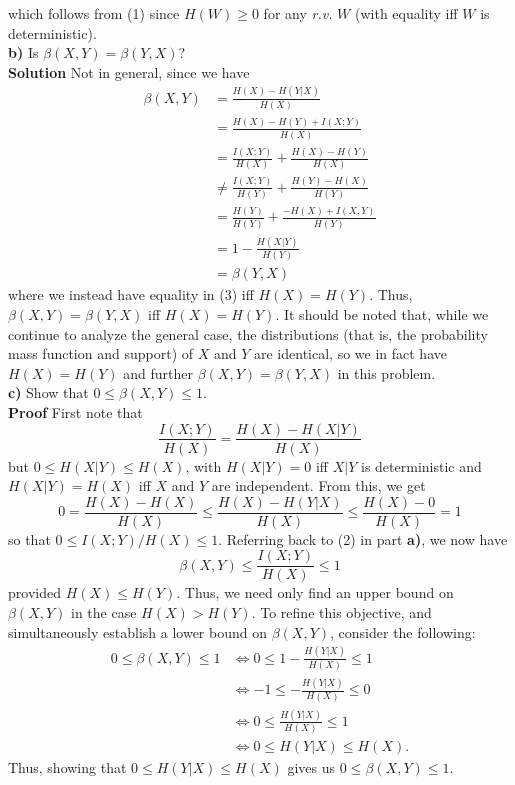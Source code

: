 \documentclass[11pt, letterpaper]{article}
\begin{document}
which follows from (1) since $H(W)\geq 0$ for any {\it r.v.} $W$ (with equality iff $W$ is deterministic).\\[10pt]
{\bf b)} Is $\beta(X,Y)=\beta(Y,X)$?\\[10pt]
{\bf Solution} Not in general, since we have
\begin{align*}
    \beta(X,Y)&=\frac{H(X)-H(Y|X)}{H(X)}\\
    &=\frac{H(X)-H(Y)+I(X;Y)}{H(X)}\tag{since $H(Y|X)=H(Y)-I(X;Y)$}\\
    &=\frac{I(X;Y)}{H(X)}+\frac{H(X)-H(Y)}{H(X)}\\
    &\neq\frac{I(X;Y)}{H(Y)}+\frac{H(Y)-H(X)}{H(Y)}\tag{3}\\
    &=\frac{H(Y)}{H(Y)}+\frac{-H(X)+I(X,Y)}{H(Y)}\\
    &=1-\frac{H(X|Y)}{H(Y)}\\
    &=\beta(Y,X)
\end{align*}
where we instead have equality in (3) iff $H(X)=H(Y)$. Thus, $\beta(X,Y)=\beta(Y,X)$ iff $H(X)=H(Y)$. It should be noted that, while we continue to analyze the general case,
the distributions (that is, the probability mass function and support) of $X$ and $Y$ are identical, so we in fact have $H(X)=H(Y)$ and further $\beta(X,Y)=\beta(Y,X)$ in this problem.\\[10pt]
{\bf c)} Show that $0\leq \beta(X,Y)\leq 1$.\\[10pt]
{\bf Proof} First note that
\[\frac{I(X;Y)}{H(X)}=\frac{H(X)-H(X|Y)}{H(X)}\]
but $0\leq H(X|Y)\leq H(X)$, with $H(X|Y)=0$ iff $X|Y$ is deterministic and $H(X|Y)=H(X)$ iff $X$ and $Y$ are independent.
From this, we get
\[0=\frac{H(X)-H(X)}{H(X)}\leq\frac{H(X)-H(Y|X)}{H(X)}\leq\frac{H(X)-0}{H(X)}=1\]
so that $0\leq I(X;Y)/H(X)\leq 1$. Referring back to (2) in part {\bf a)}, we now have 
\[\beta(X,Y)\leq \frac{I(X;Y)}{H(X)}\leq 1\]
provided $H(X)\leq H(Y)$. Thus, we need only find an upper bound on $\beta(X,Y)$ in the case $H(X)>H(Y)$. To refine this objective, and
simultaneously establish a lower bound on $\beta(X,Y)$, consider the following:
\begin{align*}
    0\leq\beta(X,Y)\leq 1&\Leftrightarrow 0\leq 1-\frac{H(Y|X)}{H(X)}\leq 1\\
    &\Leftrightarrow -1\leq -\frac{H(Y|X)}{H(X)}\leq 0\\
    &\Leftrightarrow 0\leq\frac{H(Y|X)}{H(X)}\leq 1\\
    &\Leftrightarrow 0\leq H(Y|X)\leq H(X).\tag{4}
\end{align*}
Thus, showing that $0\leq H(Y|X)\leq H(X)$ gives us $0\leq\beta(X,Y)\leq 1$.\\[10pt]
\end{document}
